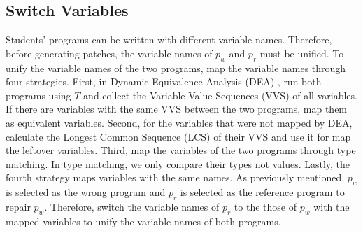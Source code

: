 \documentclass[10pt,conference]{IEEEtran}
\begin{document}
    \subsection{Switch Variables}\label{swtVariable}
        Students' programs can be written with different variable names. Therefore, before generating patches, the variable names of $p_{w}$ and $p_{r}$ must be unified. To unify the variable names of the two programs, map the variable names through four strategies. First, in Dynamic Equivalence Analysis (DEA) \cite{hu2019re}, run both programs using $T$ and collect the Variable Value Sequences (VVS) of all variables. If there are variables with the same VVS between the two programs, map them as equivalent variables. Second, for the variables that were not mapped by DEA, calculate the Longest Common Sequence (LCS) of their VVS and use it for map the leftover variables. Third, map the variables of the two programs through type matching. In type matching, we only compare their types not values. Lastly, the fourth strategy maps variables with the same names. As previously mentioned, $p_{w}$ is selected as the wrong program and $p_{r}$ is selected as the reference program to repair $p_{w}$. Therefore, switch the variable names of $p_{r}$ to the those of $p_{w}$ with the mapped variables to unify the variable names of both programs.
\end{document}
